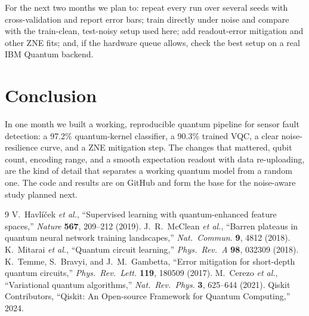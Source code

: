 \documentclass[conference,10pt]{IEEEtran}
\begin{document}
For the next two months we plan to: repeat every run over several seeds with
cross-validation and report error bars; train directly under noise and compare
with the train-clean, test-noisy setup used here; add readout-error mitigation
and other ZNE fits; and, if the hardware queue allows, check the best setup on a
real IBM Quantum backend.

\section{Conclusion}
In one month we built a working, reproducible quantum pipeline for sensor fault
detection: a 97.2\% quantum-kernel classifier, a 90.3\% trained VQC, a clear
noise-resilience curve, and a ZNE mitigation step. The changes that mattered,
qubit count, encoding range, and a smooth expectation readout with data
re-uploading, are the kind of detail that separates a working quantum model from
a random one. The code and results are on GitHub and form the base for the
noise-aware study planned next.

\begin{thebibliography}{9}
\small
{} V.~Havl\'i\v{c}ek \textit{et al.}, ``Supervised learning with
  quantum-enhanced feature spaces,'' \textit{Nature} \textbf{567}, 209--212 (2019).
 J.~R.~McClean \textit{et al.}, ``Barren plateaus in quantum
  neural network training landscapes,'' \textit{Nat.\ Commun.} \textbf{9}, 4812 (2018).
 K.~Mitarai \textit{et al.}, ``Quantum circuit learning,''
  \textit{Phys.\ Rev.\ A} \textbf{98}, 032309 (2018).
 K.~Temme, S.~Bravyi, and J.~M.~Gambetta, ``Error mitigation for
  short-depth quantum circuits,'' \textit{Phys.\ Rev.\ Lett.} \textbf{119}, 180509 (2017).
 M.~Cerezo \textit{et al.}, ``Variational quantum algorithms,''
  \textit{Nat.\ Rev.\ Phys.} \textbf{3}, 625--644 (2021).
 Qiskit Contributors, ``Qiskit: An Open-source Framework for
  Quantum Computing,'' 2024.
\end{thebibliography}
\end{document}
